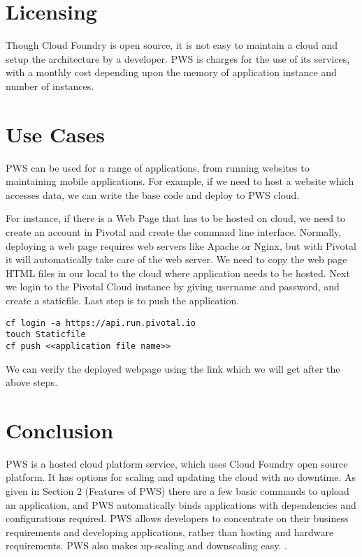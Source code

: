 \documentclass[9pt,twocolumn,twoside]{../../styles/osajnl}
\begin{document}
\section{Licensing}
Though Cloud Foundry is open source, it is not easy to maintain a cloud and setup the architecture by a developer. PWS is charges for the use of its services, with a monthly cost depending upon the memory of application instance and number of instances.  

\section{Use Cases}
PWS can be used for a range of applications, from running websites to maintaining mobile applications. For example, if we need to host a website which accesses data, we can write the base code and deploy to PWS cloud.

For instance, if there is a Web Page that has to be hosted on cloud, we need to create an account in Pivotal and create the command line interface. Normally, deploying a web page requires web servers like Apache or Nginx, but with Pivotal it will automatically take care of the web server. We need to copy the web page HTML files in our local to the cloud where application needs to be hosted. Next we login to the Pivotal Cloud instance by giving username and password, and create a staticfile. Last step is to push the application.

\begin{verbatim}
cf login -a https://api.run.pivotal.io
touch Staticfile
cf push <<application file name>>
\end{verbatim}

We can verify the deployed webpage using the link which we will get after the above steps.

\section{Conclusion}
PWS is a hosted cloud platform service, which uses Cloud Foundry open source platform. It has options for scaling and updating the cloud with no downtime. As given in Section 2 (Features of PWS) there are a few basic commands to upload an application, and PWS automatically binds applications with dependencies and configurations required. PWS allows developers to concentrate on their business requirements and developing applications, rather than hosting and hardware requirements. PWS also makes up-scaling and downscaling easy. \cite{www-pws-adv}. 
\end{document}
